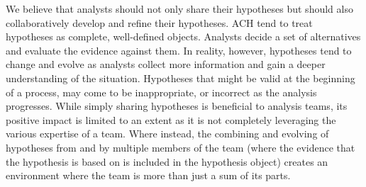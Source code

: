 We believe that analysts should not only share their hypotheses but should also collaboratively develop and refine their hypotheses. ACH tend to treat hypotheses as complete, well-defined objects. Analysts decide a set of alternatives and evaluate the evidence against them. In reality, however, hypotheses tend to change and evolve as analysts collect more information and gain a deeper understanding of the situation. Hypotheses that might be valid at the beginning of a process, may come to be inappropriate, or incorrect as the analysis progresses. While simply sharing hypotheses is beneficial to analysis teams, its positive impact is limited to an extent as it is not completely leveraging the various expertise of a team. Where instead, the combining and evolving of hypotheses from and by multiple members of the team (where the evidence that the hypothesis is based on is included in the hypothesis object) creates an environment where the team is more than just a sum of its parts.





